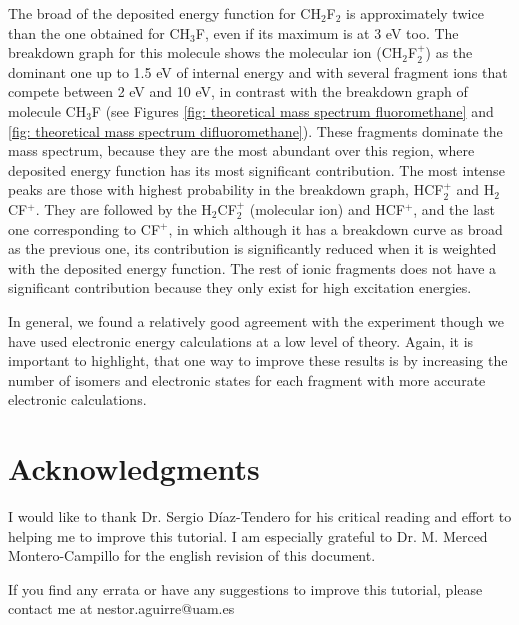 \documentclass[a4paper,12pt]{article}
\begin{document}
The broad of the deposited energy function for CH$_2$F$_2$ is approximately twice than the one obtained for CH$_3$F, even if its maximum is at 3 eV too.
The breakdown graph for this molecule shows the molecular ion (CH$_2$F$_2^+$) as the dominant one up to 1.5 eV of internal energy and with several fragment ions 
that compete between 2 eV and 10 eV, in contrast with the breakdown graph of molecule CH$_3$F (see 
Figures \ref{fig: theoretical mass spectrum fluoromethane} and \ref{fig: theoretical mass spectrum difluoromethane}). These fragments dominate the mass 
spectrum, because they are the most abundant over this region, where deposited energy function has its most significant contribution. The most intense peaks 
are those with highest probability in the breakdown graph, HCF$_2^+$ and H$_2$CF$^+$. They are followed by the H$_2$CF$_2^+$ (molecular ion) and 
HCF$^+$, and the last one corresponding to CF$^+$, in which although it has a 
breakdown curve as broad as the previous one, its contribution is significantly reduced when it is weighted with the deposited energy function. The rest of 
ionic fragments does not have a significant contribution because they only exist for high excitation energies. 

In general, we found a relatively good agreement with the experiment though we have used electronic energy calculations at a low level of theory. Again, it is 
important to highlight, that one way to improve these results is by increasing the number of isomers and electronic states for each fragment with more accurate 
electronic calculations.

\section*{Acknowledgments}
I would like to thank Dr. Sergio Díaz-Tendero for his critical reading and effort to helping me to improve this tutorial.
I am especially grateful to Dr. M. Merced Montero-Campillo for the english revision of this document.

\vspace{3cm}
If you find any errata or have any suggestions to improve this tutorial, please contact me at nestor.aguirre@uam.es
\end{document}
